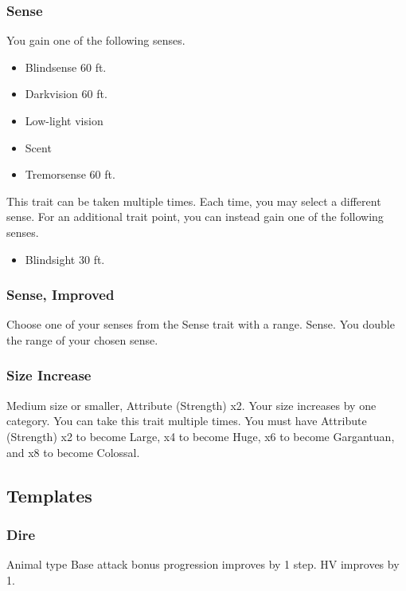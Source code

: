 \subsubsection{Sense}
\featben You gain one of the following senses.
\begin{itemize}
    \item Blindsense 60 ft.
    \item Darkvision 60 ft.
    \item Low-light vision
    \item Scent
    \item Tremorsense 60 ft.
\end{itemize}

 This trait can be taken multiple times. Each time, you may select a different sense.
 For an additional trait point, you can instead gain one of the following senses.
\begin{itemize}
    \item Blindsight 30 ft.
\end{itemize}

\subsubsection{Sense, Improved}
Choose one of your senses from the Sense trait with a range.
\featpre Sense.
\featben You double the range of your chosen sense.

\subsubsection{Size Increase}
\featpre Medium size or smaller, Attribute (Strength) x2.
\featben Your size increases by one category.
 You can take this trait multiple times. You must have Attribute (Strength) x2 to become Large, x4 to become Huge, x6 to become Gargantuan, and x8 to become Colossal.

\subsection{Templates}
\subsubsection{Dire}
\featpre Animal type
\featben Base attack bonus progression improves by 1 step. HV improves by 1.
